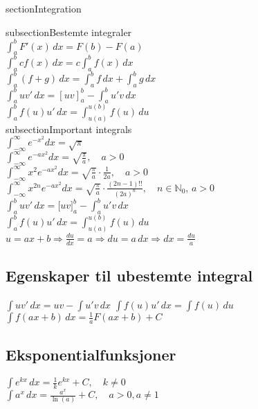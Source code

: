 \documentclass[a4paper,7pt,fleqn]{article}
\begin{document}
\newpage
\begin{multicols}{2}


\begin{minipage}{\linewidth}
section{Integration}

subsection{Bestemte integraler} \\
\( \int_{a}^{b} F'(x) \,dx = F(b) - F(a) \)  \\
\( \int_{a}^{b} c f(x) \,dx = c \int_{a}^{b} f(x) \,dx \)  \\
\( \int_{a}^{b} (f + g) \,dx = \int_{a}^{b} f \,dx + \int_{a}^{b} g \,dx \)  \\
\( \int_{a}^{b} u v' \,dx = [uv]_{a}^{b} - \int_{a}^{b} u' v \,dx \)  \\
\( \int_{a}^{b} f(u) u' \,dx = \int_{u(a)}^{u(b)} f(u) \,du \)  \\


subsection{Important integrals}\\
\(\int_{-\infty}^\infty e^{-x^2} dx = \sqrt{\pi}\) \\
\(\int_{-\infty}^\infty e^{-a x^2} dx = \sqrt{\frac{\pi}{a}}, \quad a > 0\) \\
\(\int_{-\infty}^\infty x^2 e^{-a x^2} dx = \sqrt{\frac{\pi}{a}} \cdot \frac{1}{2a}, \quad a > 0\) \\
\(\int_{-\infty}^\infty x^{2n} e^{-a x^2} dx = \sqrt{\frac{\pi}{a}} \cdot \frac{(2n-1)!!}{(2a)^n}, \quad n \in \mathbb{N}_0, \, a > 0\) \\
\(\int_a^b u v' \, dx = \big[ u v \big]_a^b - \int_a^b u' v \, dx\) \\
\(\int_a^b f(u) u' \, dx = \int_{u(a)}^{u(b)} f(u) \, du \) \\
\(u = ax + b \Rightarrow \frac{du}{dx} = a \Rightarrow du = a \, dx \Rightarrow dx = \frac{du}{a} \) \\
\end{minipage}

\subsection{Egenskaper til ubestemte integral}  
\(\int u v' \,dx = uv - \int u' v \,dx\)  
\(\int f(u) u' \,dx = \int f(u) \,du\)  
\(\int f(ax + b) \,dx = \frac{1}{a} F(ax + b) + C\)  


\begin{minipage}{\linewidth}
\subsection*{Eksponentialfunksjoner}
\(\int e^{kx} \, dx = \frac{1}{k} e^{kx} + C, \quad k \neq 0\) \\
\(\int a^x \, dx = \frac{a^x}{\ln(a)} + C, \quad a > 0, a \neq 1\) \\


\end{minipage}
\end{multicols}
\end{document}
